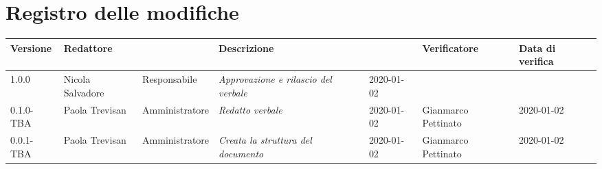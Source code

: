 \section*{Registro delle modifiche}
\renewcommand{\arraystretch}{1.8}
  \setlength\LTleft{-1.7cm}
  \begin{longtable}{|p{1.7cm}|p{2cm}|p{2.5cm}|p{3cm}|p{1.7cm}|p{2cm}|p{2.3cm}|}
    \hline
    \rowcolor{header}
    \textbf{Versione} & \textbf{Redattore} & \centering{\textbf{Ruolo}} & \textbf{Descrizione} &      \centering{\textbf{Data}} & \textbf{Verificatore} & \textbf{Data di verifica} \\
    \hline
    1.0.0 & Nicola Salvadore & Responsabile & \small{\textit{Approvazione e rilascio del verbale}} & 2020-01-02 & & \\
	0.1.0-TBA & Paola Trevisan & Amministratore & \small{\textit{Redatto verbale}} & 2020-01-02 & Gianmarco Pettinato & 2020-01-02 \\
    0.0.1-TBA & Paola Trevisan & Amministratore & \small{\textit{Creata la struttura del documento}} & 2020-01-02 & Gianmarco Pettinato & 2020-01-02 \\

    \hline
  \end{longtable}
  \setlength\LTleft{0cm}
